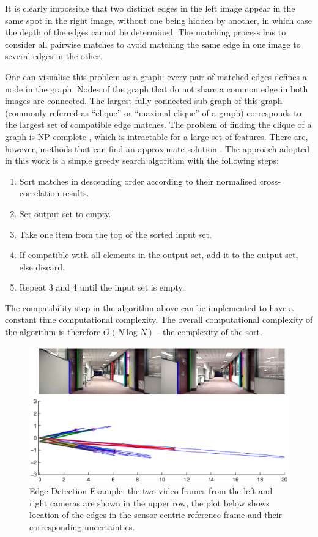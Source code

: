 It is clearly impossible that two distinct edges in the left image
appear in the same spot in the right image, without one being hidden
by another, in which case the depth of the edges cannot be
determined. The matching process has to consider all pairwise matches
to avoid matching the same edge in one image to several edges in the
other.

One can visualise this problem as a graph: every pair of matched edges
defines a node in the graph. Nodes of the graph that do not share a
common edge in both images are connected. The largest fully connected
sub-graph of this graph (commonly referred as ``clique'' or ``maximal
clique'' of a graph) corresponds to the largest set of compatible edge
matches. The problem of finding the clique of a graph is NP complete
\cite{cook1971ctp}, which is intractable for a large set of
features. There are, however, methods that can find an approximate
solution \cite{balas1986fmc,pardalos1994mcp}. The approach adopted in
this work is a simple greedy search algorithm with the following steps:

\begin{enumerate}
\item Sort matches in descending order according to their normalised
  cross-correlation results.
\item Set output set to empty.
\item Take one item from the top of the sorted input set.
\item If compatible with all elements in the output set, add it to the
  output set, else discard.
\item Repeat 3 and 4 until the input set is empty.
\end{enumerate}

The compatibility step in the algorithm above can be implemented to
have a constant time computational complexity. The overall
computational complexity of the algorithm is therefore $O(N \log N)$ -
the complexity of the sort.

\begin{figure}[htbp]
  \centering
  \includegraphics[width=13cm]{Pics/example_edge_detector}
  \caption[Edge Detection Example]{Edge Detection Example: the two
    video frames from the left and right cameras are shown in the
    upper row, the plot below shows location of the edges in the
    sensor centric reference frame and their corresponding
    uncertainties.}
  \label{fig:example_edge_detector}
\end{figure}

